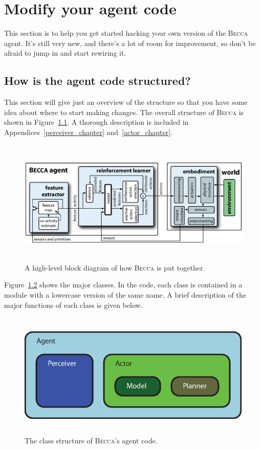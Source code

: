 \chapter{Modify your agent code}

This section is to help you get started hacking your own version of the \textsc{Becca} agent. It's still very new, and there's a lot of room for improvement, so don't be afraid to jump in and start rewiring it.

\section{How is the agent code structured?}

This section will give just an overview of the structure so that you have some idea about where to start making changes. The overall structure of \textsc{Becca} is shown in Figure~\ref{becca_block}. A thorough description is included in Appendices~\ref{perceiver_chapter} and~\ref{actor_chapter}. 

\begin{figure}
\centering
\includegraphics[height=6cm]{figs/becca_0.4.3_block.eps}
\caption{A high-level block diagram of how \textsc{Becca} is put together.}
\label{becca_block}
\end{figure}

Figure~\ref{class_structure} shows the major classes. In the code, each class is contained in a module with a lowercase version of the same name. A brief description of the major functions of each class is given below.

\begin{figure}
\centering
\includegraphics[height=6cm]{figs/class_structure.eps}
\caption{The class structure of \textsc{Becca}'s agent code.}
\label{class_structure}
\end{figure}

